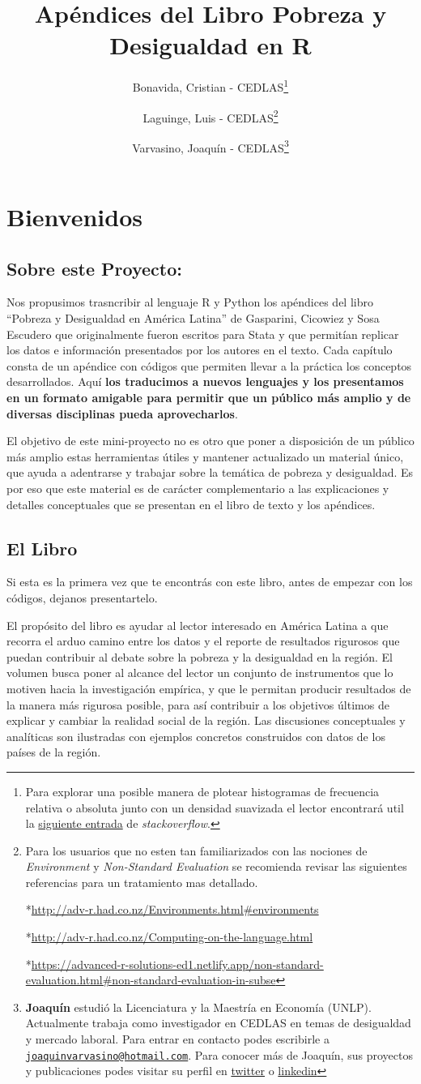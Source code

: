 \documentclass[
]{book}
\title{Apéndices del Libro Pobreza y Desigualdad en R}
\author{Bonavida, Cristian - CEDLAS\footnote{Para explorar una posible manera de plotear histogramas de frecuencia relativa o absoluta junto con un densidad suavizada el lector encontrará util la \href{https://stackoverflow.com/questions/27611438/density-curve-overlay-on-histogram-where-vertical-axis-is-frequency-aka-count}{siguiente entrada} de \emph{stackoverflow}.} \and Laguinge, Luis - CEDLAS\footnote{Para los usuarios que no esten tan familiarizados con las nociones de \emph{Environment} y \emph{Non-Standard Evaluation} se recomienda revisar las siguientes referencias para un tratamiento mas detallado.

  *\url{http://adv-r.had.co.nz/Environments.html\#environments}

  *\url{http://adv-r.had.co.nz/Computing-on-the-language.html}

  *\url{https://advanced-r-solutions-ed1.netlify.app/non-standard-evaluation.html\#non-standard-evaluation-in-subse}} \and Varvasino, Joaquín - CEDLAS\footnote{\textbf{Joaquín} estudió la Licenciatura y la Maestría en Economía (UNLP). Actualmente trabaja como investigador en CEDLAS en temas de desigualdad y mercado laboral. Para entrar en contacto podes escribirle a \href{mailto:joaquinvarvasino@hotmail.com}{\nolinkurl{joaquinvarvasino@hotmail.com}}. Para conocer más de Joaquín, sus proyectos y publicaciones podes visitar su perfil en \href{https://twitter.com/mynameisjoaco}{twitter} o \href{https://www.linkedin.com/in/joaquin-varvasino-826819135/}{linkedin}}}
\date{}
\begin{document}
\maketitle

{
\setcounter{tocdepth}{1}
\tableofcontents
}
\hypertarget{bienvenidos}{%
\chapter{Bienvenidos}\label{bienvenidos}}

\hypertarget{sobre-este-proyecto}{%
\section*{Sobre este Proyecto:}\label{sobre-este-proyecto}}

Nos propusimos trasncribir al lenguaje R y Python los apéndices del libro ``Pobreza y Desigualdad en América Latina'' de Gasparini, Cicowiez y Sosa Escudero que originalmente fueron escritos para Stata y que permitían replicar los datos e información presentados por los autores en el texto. Cada capítulo consta de un apéndice con códigos que permiten llevar a la práctica los conceptos desarrollados. Aquí \textbf{los traducimos a nuevos lenguajes y los presentamos en un formato amigable para permitir que un público más amplio y de diversas disciplinas pueda aprovecharlos}.

El objetivo de este mini-proyecto no es otro que poner a disposición de un público más amplio estas herramientas útiles y mantener actualizado un material único, que ayuda a adentrarse y trabajar sobre la temática de pobreza y desigualdad. Es por eso que este material es de carácter complementario a las explicaciones y detalles conceptuales que se presentan en el libro de texto y los apéndices.

\hypertarget{el-libro}{%
\section*{El Libro}\label{el-libro}}

Si esta es la primera vez que te encontrás con este libro, antes de empezar con los códigos, dejanos presentartelo.

El propósito del libro es ayudar al lector interesado en América Latina a que recorra el arduo camino entre los datos y el reporte de resultados rigurosos que puedan contribuir al debate sobre la pobreza y la desigualdad en la región. El volumen busca poner al alcance del lector un conjunto de instrumentos que lo motiven hacia la investigación empírica, y que le permitan producir resultados de la manera más rigurosa posible, para así contribuir a los objetivos últimos de explicar y cambiar la realidad social de la región. Las discusiones conceptuales y analíticas son ilustradas con ejemplos concretos construidos con datos de los países de la región.
\end{document}
